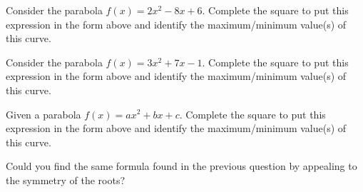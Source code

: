 \begin{prob}
Consider the parabola $f(x) = 2x^2 - 8x + 6$. Complete the square to
put this expression in the form above and identify the maximum/minimum
value(s) of this curve.
\end{prob}

\begin{prob}
Consider the parabola $f(x) = 3x^2 + 7x - 1$. Complete the square to
put this expression in the form above and identify the maximum/minimum
value(s) of this curve.
\end{prob}


\begin{prob}
Given a parabola $f(x) = ax^2 + bx +c$. Complete the square to put
this expression in the form above and identify the maximum/minimum
value(s) of this curve.
\end{prob}


\begin{prob}
Could you find the same formula found in the previous question by
appealing to the symmetry of the roots?
\end{prob}





